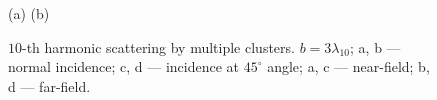 \begin{figure}[H]
    (a)\:
    (b)\:
    \caption{$10$-th harmonic scattering by multiple clusters. $b = 3\lambda_{10}$; a, b --- normal incidence; c, d --- incidence at $45^{\circ}$ angle; a, c --- near-field; b, d --- far-field.}
    \label{multi_sph_b3:image}
\end{figure}